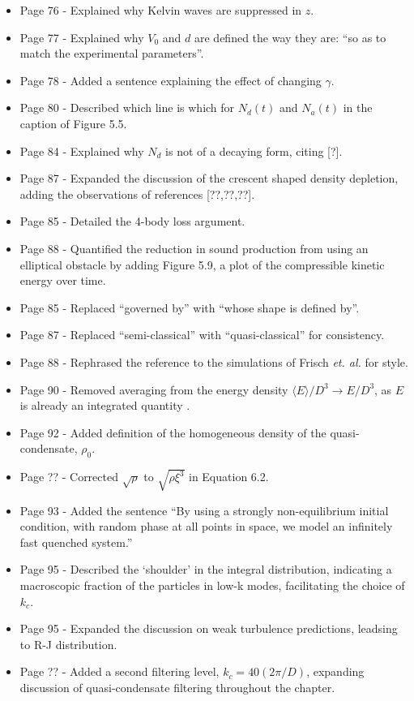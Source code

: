 \documentclass{article}
\begin{document}
\begin{itemize}
\item Page 76 - Explained why Kelvin waves are suppressed in $z$.
\item Page 77 - Explained why $V_0$ and $d$ are defined the way they are: ``so as to match the experimental parameters''.
\item Page 78 - Added a sentence explaining the effect of changing $\gamma$.
\item Page 80 - Described which line is which for $N_d(t)$ and $N_a(t)$ in the caption of Figure 5.5.
\item Page 84 - Explained why $N_d$ is not of a decaying form, citing [?].
\item Page 87 - Expanded the discussion of the crescent shaped density depletion, adding the observations of references [??,??,??].
\item Page 85 - Detailed the 4-body loss argument.
\item Page 88 - Quantified the reduction in sound production from using an elliptical obstacle by adding Figure 5.9, a plot of the compressible kinetic energy over time.
\item Page 85 - Replaced ``governed by'' with ``whose shape is defined by''.
\item Page 87 - Replaced ``semi-classical'' with ``quasi-classical'' for consistency.
\item Page 88 - Rephrased the reference to the simulations of Frisch {\it et. al.} for style.
\item Page 90 - Removed averaging from the energy density $\langle E \rangle/D^3 \rightarrow E/D^3$, as $E$ is already an integrated quantity .
\item Page 92 - Added definition of the homogeneous density of the quasi-condensate, $\rho_0$.
\item Page ?? - Corrected $\sqrt{\rho}$ to $\sqrt{\rho\xi^3}$ in Equation 6.2.
\item Page 93 - Added the sentence ``By using a strongly non-equilibrium initial condition, with random phase at all points in space, we model an infinitely fast quenched system.''
\item Page 95 - Described the `shoulder' in the integral distribution, indicating a macroscopic fraction of the particles in low-k modes, facilitating the choice of $k_c$.
\item Page 95 - Expanded the discussion on weak turbulence predictions, leadsing to R-J distribution.
\item Page ?? - Added a second filtering level, $k_c=40 (2\pi/D)$, expanding discussion of quasi-condensate filtering throughout the chapter.

\end{itemize}
\end{document}
